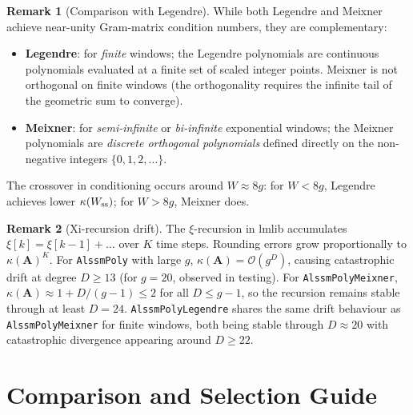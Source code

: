 \documentclass[11pt, a4paper]{article}
\theoremstyle{definition}
\newtheorem{remark}{Remark}
\newcommand{\mA}{\bm{A}}
\begin{document}
\begin{remark}[Comparison with Legendre]
While both Legendre and Meixner achieve near-unity Gram-matrix condition numbers,
they are complementary:
\begin{itemize}
  \item \textbf{Legendre}: for \emph{finite} windows; the Legendre polynomials
    are continuous polynomials evaluated at a finite set of scaled integer
    points.  Meixner is not orthogonal on finite windows (the orthogonality
    requires the infinite tail of the geometric sum to converge).
  \item \textbf{Meixner}: for \emph{semi-infinite} or \emph{bi-infinite}
    exponential windows; the Meixner polynomials are \emph{discrete
    orthogonal polynomials} defined directly on the non-negative integers
    $\{0,1,2,\ldots\}$.
\end{itemize}
The crossover in conditioning occurs around $W \approx 8g$: for $W < 8g$,
Legendre achieves lower $\kappa(W_{\rm ss})$; for $W > 8g$, Meixner does.
\end{remark}

\begin{remark}[Xi-recursion drift]
The $\xi$-recursion in lmlib accumulates $\xi[k] = \xi[k-1] + \ldots$ over
$K$ time steps.  Rounding errors grow proportionally to $\kappa(\mA)^K$.
For \texttt{AlssmPoly} with large $g$, $\kappa(\mA) = \mathcal{O}(g^D)$,
causing catastrophic drift at degree $D \geq 13$ (for $g=20$, observed in
testing).  For \texttt{AlssmPolyMeixner},
$\kappa(\mA) \approx 1 + D/(g-1) \leq 2$ for all $D \leq g-1$, so the
recursion remains stable through at least $D=24$.  \texttt{AlssmPolyLegendre}
shares the same drift behaviour as \texttt{AlssmPolyMeixner} for finite windows,
both being stable through $D \approx 20$ with catastrophic divergence
appearing around $D \geq 22$.
\end{remark}

\section{Comparison and Selection Guide}
\end{document}
